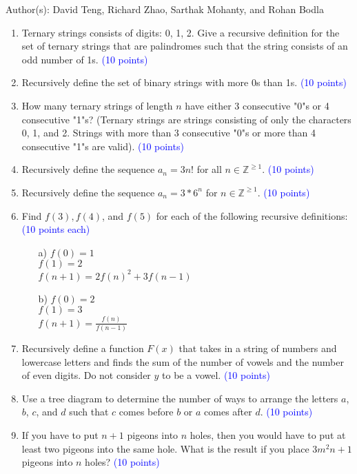 \documentclass{article}
\newcommand{\pt}[1]{\textcolor{blue}{(#1 points)}}
\newcommand{\pte}[1]{\textcolor{blue}{(#1 points each)}}
\begin{document}
Author(s): David Teng, Richard Zhao, Sarthak Mohanty, and Rohan Bodla
\newpage
\begin{enumerate}

\item Ternary strings consists of digits: 0, 1, 2.  Give a recursive definition for the set of ternary strings that are palindromes such that the string consists of an odd number of 1s. \pt{10}

\item Recursively define the set of binary strings with more 0s than 1s. \pt{10}

\item How many ternary strings of length $n$ have either 3 consecutive "0"s or 4 consecutive "1"s? (Ternary strings are strings consisting of only the characters 0, 1, and 2. Strings with more than 3 consecutive "0"s or more than 4 consecutive "1"s are valid). \pt{10}

\item Recursively define the sequence $a_n = 3n!$ for all $n \in \mathbb{Z}^{\geq 1}$. \pt{10}

\item Recursively define the sequence $a_n = 3 * 6^n$ for $n \in \mathbb{Z}^{\geq 1}$. \pt{10}

\item Find $f(3), f(4)$, and $f(5)$ for each of the following recursive definitions: \pte{10}
\begin{enumerate}
    \item[a)] $f(0) = 1$\\
    $f(1) = 2$\\
    $f(n + 1) = {2f(n)}^2 + 3f(n - 1)$
    \item[b)] $f(0) = 2$\\
    $f(1) = 3$\\
    $f(n+1) = \frac{f(n)}{f(n-1)}$
\end{enumerate}

\item Recursively define a function $F(x)$ that takes in a string of numbers and lowercase letters and finds the sum of the number of vowels and the number of even digits. Do not consider $y$ to be a vowel. \pt{10}

\item Use a tree diagram to determine the number of ways to arrange the letters $a$, $b$, $c$, and $d$ such that $c$ comes before $b$ or $a$ comes after $d$. \pt{10}

\item If you have to put $n + 1$ pigeons into $n$ holes, then you would have to put at least two pigeons into the same hole. What is the result if you place $3m^2n + 1$ pigeons into $n$ holes? \pt{10}


\end{enumerate}
\end{document}
